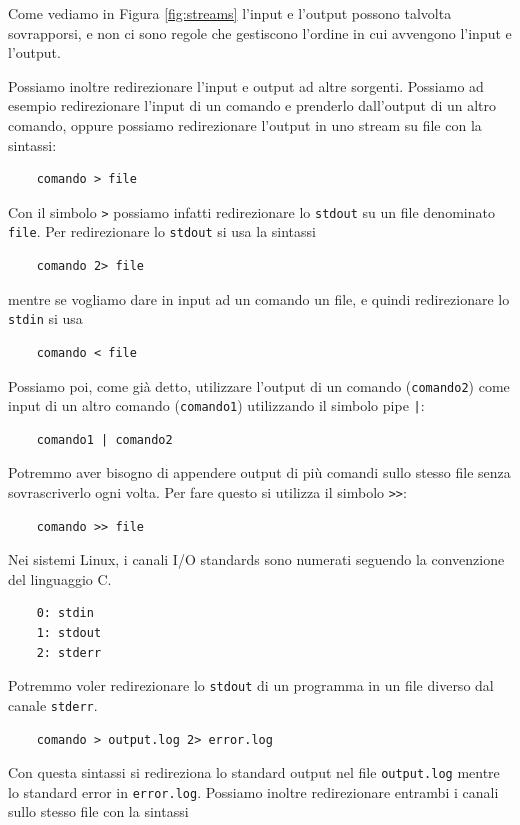\documentclass[11pt]{book}
\begin{document}
Come vediamo in Figura \ref{fig:streams} l'input e l'output possono talvolta sovrapporsi, e non ci sono regole che gestiscono l'ordine in cui avvengono l'input e l'output. 

Possiamo inoltre redirezionare l'input e output ad altre sorgenti. Possiamo ad esempio redirezionare l'input di un comando e prenderlo dall'output di un altro comando, oppure possiamo redirezionare l'output in uno stream su file con la sintassi:
\begin{verbatim}
	comando > file
\end{verbatim} 

Con il simbolo \verb">" possiamo infatti redirezionare lo \verb"stdout" su un file denominato \verb"file". Per redirezionare lo \verb"stdout" si usa la sintassi

\begin{verbatim}
	comando 2> file
\end{verbatim}

mentre se vogliamo dare in input ad un comando un file, e quindi redirezionare lo \verb"stdin" si usa
\begin{verbatim}
	comando < file
\end{verbatim}

Possiamo poi, come già detto, utilizzare l'output di un comando (\verb"comando2") come input di un altro comando (\verb"comando1") utilizzando il simbolo pipe \verb"|":
\begin{verbatim}
	comando1 | comando2
\end{verbatim}

Potremmo aver bisogno di appendere output di più comandi sullo stesso file senza sovrascriverlo ogni volta. Per fare questo si utilizza il simbolo \verb">>":
\begin{verbatim}
	comando >> file
\end{verbatim}

Nei sistemi Linux, i canali I/O standards sono numerati seguendo la convenzione del linguaggio C. \begin{verbatim}
	0: stdin
	1: stdout
	2: stderr
\end{verbatim}
Potremmo voler redirezionare lo \verb"stdout" di un programma in un file diverso dal canale \verb"stderr". 
\begin{verbatim}
	comando > output.log 2> error.log
\end{verbatim}
Con questa sintassi si redireziona lo standard output nel file \verb"output.log" mentre lo standard error in \verb"error.log". Possiamo inoltre redirezionare entrambi i canali sullo stesso file con la sintassi
\end{document}
